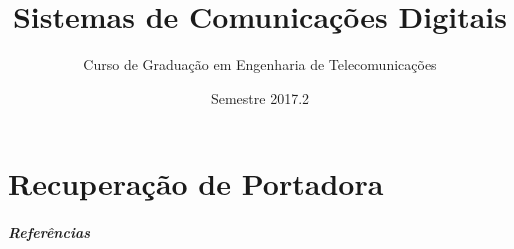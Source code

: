 \documentclass{beamer}
\title[Sist. de Com. Digital]{Sistemas de Comunicações Digitais}
\author[DETI]{Curso de Graduação em Engenharia de Telecomunicações}
\institute[UFC]{\normalsize Universidade Federal do Ceará}
\date{Semestre 2017.2}
\begin{document}
\begin{frame}
	\titlepage
\end{frame}


% 

% 

% 

% 

% 

\part{Recuperação de Portadora}


% 

% 

\begin{frame}
    \frametitle{Referências}
    
    
\end{frame}
\end{document}
